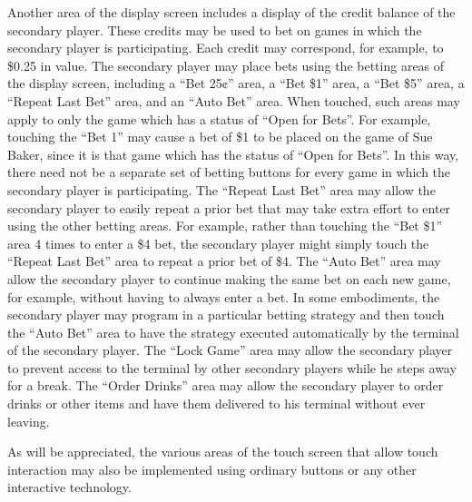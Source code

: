 \documentclass[11pt,a4paper]{article}
\begin{document}
Another area of the display screen includes a display of the credit balance of the secondary player. These credits may be used to bet on games in which the secondary player is participating. Each credit may correspond, for example, to \$0.25 in value. The secondary player may place bets using the betting areas of the display screen, including a “Bet 25¢” area, a “Bet \$1” area, a “Bet \$5” area, a “Repeat Last Bet” area, and an “Auto Bet” area. When touched, such areas may apply to only the game which has a status of “Open for Bets”. For example, touching the “Bet 1” may cause a bet of \$1 to be placed on the game of Sue Baker, since it is that game which has the status of “Open for Bets”. In this way, there need not be a separate set of betting buttons for every game in which the secondary player is participating. The “Repeat Last Bet” area may allow the secondary player to easily repeat a prior bet that may take extra effort to enter using the other betting areas. For example, rather than touching the “Bet \$1” area 4 times to enter a \$4 bet, the secondary player might simply touch the “Repeat Last Bet” area to repeat a prior bet of \$4. The “Auto Bet” area may allow the secondary player to continue making the same bet on each new game, for example, without having to always enter a bet. In some embodiments, the secondary player may program in a particular betting strategy and then touch the “Auto Bet” area to have the strategy executed automatically by the terminal of the secondary player. The “Lock Game” area may allow the secondary player to prevent access to the terminal by other secondary players while he steps away for a break. The “Order Drinks” area may allow the secondary player to order drinks or other items and have them delivered to his terminal without ever leaving.

As will be appreciated, the various areas of the touch screen that allow touch interaction may also be implemented using ordinary buttons or any other interactive technology.
\end{document}
